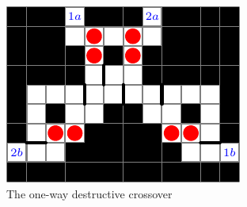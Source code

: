 \documentclass[11pt]{article}
\begin{document}
\begin{figure}[!ht]
  \centering
  \caption{Two types of crossover gadgets}
  \begin{subfigure}[b]{0.55\textwidth}
    \includegraphics[width=\textwidth]{CrossoverDestructive}
    \caption{The one-way destructive crossover}
    \label{ldeCoeffs}
  \end{subfigure}
  \hfill
  \begin{subfigure}[b]{0.35\textwidth}

\end{subfigure}
\end{figure}
\end{document}

